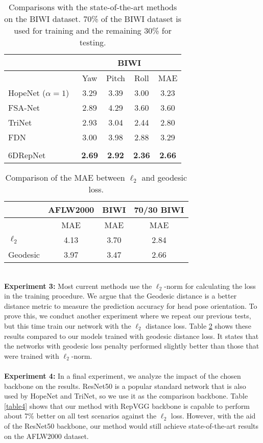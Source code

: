 \documentclass{article}
\newcommand\netname{6DRepNet}
\begin{document}
\begin{table}[t]
\begin{tabularx}{\linewidth} 
{    l  @{\hskip .3in}  c    c  c   c  }
\hline
& \multicolumn{4}{c}{\textbf{BIWI}}\\
\hline
  & Yaw & Pitch & Roll & MAE \\
  \hline
 HopeNet ($\alpha =1$)~\cite{Ruiz2018FineGrainedHP} & 3.29 & 3.39 & 3.00 &  3.23\\ FSA-Net~\cite{Yang_2019_CVPR}& 2.89 & 4.29 & 3.60 & 3.60 \\
 TriNet~\cite{Cao_2021_WACV} & 2.93 & 3.04 & 2.44 & 2.80 \\
 FDN~\cite{Zhang2020FDNFD} &3.00 & 3.98&  2.88&  3.29 \\
  \hline\\[-2ex] 
\netname & \textbf{2.69} & \textbf{2.92} & \textbf{2.36} & \textbf{2.66}\\
\hline
\end{tabularx}
\caption{Comparisons with the state-of-the-art methods on the
BIWI dataset. 70\% of the BIWI dataset is used for training and the remaining 30\% for testing.}
\label{table2}
\end{table}
\begin{table}[t]
\begin{tabularx}{\linewidth} 
{    l  @{\hskip .5in}  c   c  c  }
\hline

& \textbf{AFLW2000} &\textbf{BIWI} & \textbf{70/30 BIWI}\\
\hline
  & MAE  & MAE & MAE \\
  \hline
$\ell_2$ &  4.13 & 3.70 & 2.84 \\
Geodesic & 3.97 & 3.47 & 2.66\\

\hline
\end{tabularx}
\caption{Comparison of the MAE between $\ell_2$ and geodesic loss.}
\label{table3}
\end{table}
\\
\textbf{Experiment 3:} Most current methods use the $\ell_2$-norm for calculating the loss in the training procedure. We argue that the Geodesic distance is a better distance metric to measure the prediction accuracy for head pose orientation. To prove this, we conduct another experiment where we repeat our previous tests, but this time train our network with the  $\ell_2$ distance loss. Table \ref{table3} shows these results compared to our models trained with geodesic distance loss. It states that the networks with geodesic loss penalty performed slightly better than those that were trained with  $\ell_2$-norm. 
\\
\\
\textbf{Experiment 4:} In a final experiment, we analyze the impact of the chosen backbone on the results. ResNet50 is a popular standard network that is also used by HopeNet and TriNet, so we use it as the comparison backbone. Table \ref{table4} shows that our method with RepVGG backbone is capable to perform about 7\% better on all test scenarios against the $\ell_2$ loss. However, with the aid of the ResNet50 backbone, our method would still achieve state-of-the-art results on the AFLW2000 dataset.
\end{document}
